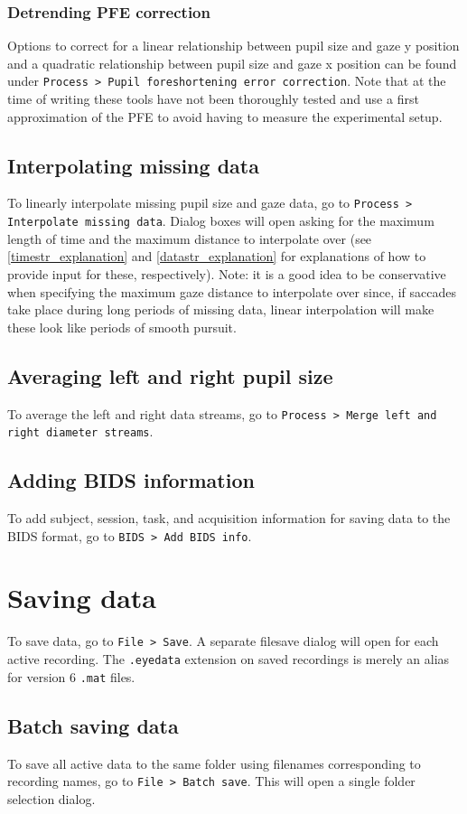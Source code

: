 \documentclass{article}
\begin{document}
\subsubsection{Detrending PFE correction}
Options to correct for a linear relationship between pupil size and gaze y position and a quadratic relationship between pupil size and gaze x position can be found under \texttt{Process > Pupil foreshortening error correction}. Note that at the time of writing these tools have not been thoroughly tested and use a first approximation of the PFE to avoid having to measure the experimental setup.
\subsection{Interpolating missing data}
To linearly interpolate missing pupil size and gaze data, go to \texttt{Process > Interpolate missing data}. Dialog boxes will open asking for the maximum length of time and the maximum distance to interpolate over (see \ref{timestr_explanation} and \ref{datastr_explanation} for explanations of how to provide input for these, respectively). Note: it is a good idea to be conservative when specifying the maximum gaze distance to interpolate over since, if saccades take place during long periods of missing data, linear interpolation will make these look like periods of smooth pursuit.
\subsection{Averaging left and right pupil size}
To average the left and right data streams, go to \texttt{Process > Merge left and right diameter streams}.
\subsection{Adding BIDS information}
To add subject, session, task, and acquisition information for saving data to the BIDS format, go to \texttt{BIDS > Add BIDS info}.
\section{Saving data}
To save data, go to \texttt{File > Save}. A separate filesave dialog will open for each active recording. The \texttt{.eyedata} extension on saved recordings is merely an alias for version 6 \texttt{.mat} files.
\subsection{Batch saving data}
To save all active data to the same folder using filenames corresponding to recording names, go to \texttt{File > Batch save}. This will open a single folder selection dialog.
\end{document}
